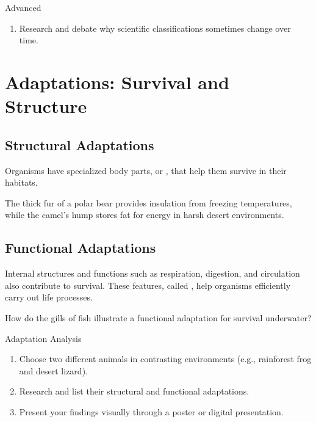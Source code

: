 \begin{tieredquestions}{Advanced}
\begin{enumerate}
    \item Research and debate why scientific classifications sometimes change over time.
\end{enumerate}
\end{tieredquestions}

\section{Adaptations: Survival and Structure}

\subsection{Structural Adaptations}

Organisms have specialized body parts, or , that help them survive in their habitats.

\begin{example}
The thick fur of a polar bear provides insulation from freezing temperatures, while the camel’s hump stores fat for energy in harsh desert environments.
\end{example}


\subsection{Functional Adaptations}

Internal structures and functions such as respiration, digestion, and circulation also contribute to survival. These features, called , help organisms efficiently carry out life processes.

\begin{stopandthink}
How do the gills of fish illustrate a functional adaptation for survival underwater?
\end{stopandthink}

\begin{investigation}{Adaptation Analysis}
\begin{enumerate}
    \item Choose two different animals in contrasting environments (e.g., rainforest frog and desert lizard).
    \item Research and list their structural and functional adaptations.
    \item Present your findings visually through a poster or digital presentation.
\end{enumerate}
\end{investigation}

